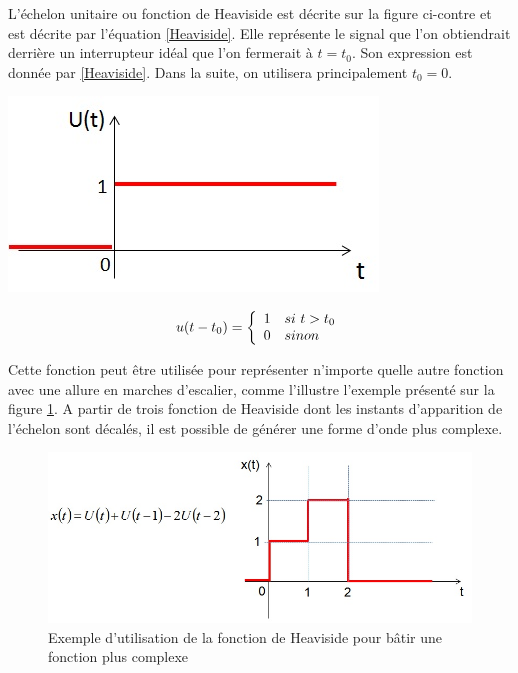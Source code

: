 \documentclass[]{book}
\begin{document}
{	\begin{minipage}[l]{0.7\linewidth}
		L'échelon unitaire ou fonction de Heaviside est décrite sur la figure ci-contre et est décrite par l'équation \ref{Heaviside}. Elle représente le signal que l'on obtiendrait derrière un interrupteur
		idéal que l'on fermerait à $t = t_{0}$. Son expression est donnée par \ref{Heaviside}. Dans la suite, on utilisera principalement $t_{0} = 0$.	
	\end{minipage} \hfill
	\begin{minipage}[r]{0.4\linewidth}
		\includegraphics[scale=0.5]{images/Heaviside.jpg} 	
	\end{minipage}
	 
	\begin{equation}\label{Heaviside}
	u(t-t_{0}) = \left \{
	\begin{array}{l l}
	1  & si~t>t_{0} \\
	0   & sinon \\
	\end{array}
	\right .	 	
	\end{equation}
	
	
	Cette fonction peut être utilisée pour représenter n'importe quelle autre fonction avec une allure en marches d'escalier, comme l'illustre l'exemple présenté sur la figure \ref{Fig:Utilisation_Heaviside}. A partir de trois fonction de Heaviside dont les instants d'apparition de l'échelon sont décalés, il est possible de générer une forme d'onde plus complexe.
	\begin{figure}[h!]
		\centering
		\includegraphics[scale=0.5]{images/Utilisation_Heaviside.jpg} 
		\caption{Exemple d'utilisation de la fonction de Heaviside pour bâtir une fonction plus complexe}	
		\label{Fig:Utilisation_Heaviside}
	\end{figure}
	
}
\end{document}
